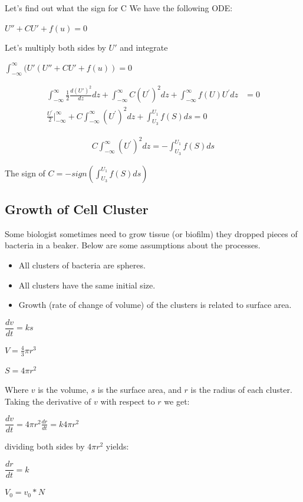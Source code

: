 \documentclass[]{article}
\numberwithin{equation}{section}		%
\begin{document}
Let's find out what the sign for C
We have the following ODE:

\begin{center}
$U'' + CU' + f(u) = 0$
\end{center}

Let's multiply both sides by $U'$ and integrate

\begin{center}
$\int _{-\infty}^{\infty} (U' (U''+CU'+f (u ) )=0$
\end{center}

\begin{align}
\int_{-\infty}^{\infty}\frac{1}{2}\frac{d({U}')^2}{dz}dz+\int_{-\infty}^{\infty}C(U^{'})^{2}dz+\int_{-\infty}^{\infty}f(U)U^{'}dz & =0\\
\frac{U^{'}}{2}|_{-\infty}^{\infty}\nonumber+C\int_{-\infty}^{\infty}(U^{'})^{2}dz\nonumber+\int_{U_{3}}^{U_{1}}f(S)ds=0
\end{align}

\begin{align}
C\int_{-\infty}^{\infty}(U^{'})^{2}dz\nonumber=-\int_{U_{3}}^{U_{1}}f(S)ds
\end{align}

The sign of $C = -sign (\int _{U_3}^{U_1}f (S )ds )$

\subsection{Growth of Cell Cluster}
Some biologist sometimes need to grow tissue (or biofilm) they dropped pieces of bacteria in a beaker. Below are some assumptions about the processes.

\begin{itemize}
	\item All clusters of bacteria are spheres.
	\item All clusters have the same initial size.
	\item Growth (rate of change of volume) of the clusters is related to surface area.
\end{itemize}
\begin{center}
$\dfrac{dv}{dt}=ks$
\end{center}
\begin{center}
$V=\frac{4}{3}\pi r^{3}$
\end{center}
\begin{center}
$S=4\pi r^{2}$
\end{center}

Where $v$ is the volume, $s$ is the surface area, and $r$ is the radius of each cluster. Taking the derivative of $v$ with respect to $r$ we get:
\begin{center}
$\dfrac{dv}{dt}=4\pi r^{2}\frac{dr}{dt}=k4\pi r^{2}$ 
\end{center}
dividing both sides by $4\pi r^{2}$ yields:
\begin{center}
$\dfrac{dr}{dt}= k$
\end{center}
\begin{center}
$V_{0}= v_{0}*N $
\end{center}
\end{document}
